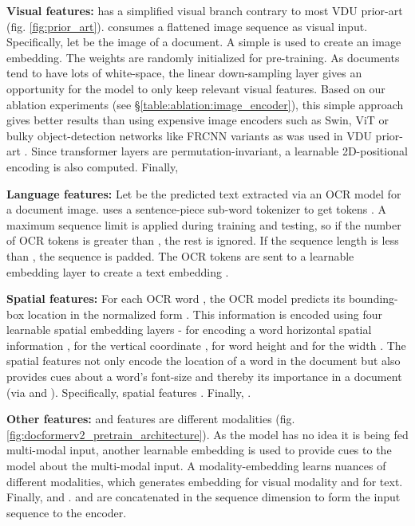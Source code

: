 \documentclass[10pt,twocolumn,letterpaper]{article}
\begin{document}
\label{sec:approach:arch:visual}
\noindent\textbf{Visual features:} \papertitleshort has a simplified visual branch contrary to most VDU prior-art (fig. \ref{fig:prior_art}). \papertitleshort consumes a flattened image sequence as visual input. Specifically, let  be the image of a document. A simple  is used to create an image embedding. The weights are randomly initialized for pre-training. As documents tend to have lots of white-space, the linear down-sampling layer gives an opportunity for the model to only keep relevant visual features. Based on our ablation experiments (see \S \ref{table:ablation:image_encoder}), this simple approach gives better results than using expensive image encoders such as Swin, ViT  \cite{Liu2021Swin, dosovitskiy2020image, Ronneberger2015UNet} or bulky object-detection networks like FRCNN variants \cite{Ren2015FasterFRCNN} as was used in VDU prior-art \cite{powalski2021going,appalaraju2021docformer,xu2021layoutlmv2}.
Since transformer layers are permutation-invariant, a learnable 2D-positional encoding  is also computed. Finally, 


\label{sec:approach:arch:language}
\noindent\textbf{Language features:} Let  be the predicted text extracted via an OCR model for a document image. \papertitleshort uses a sentence-piece sub-word tokenizer \cite{Kudo2018SentencePiece} to get tokens . A maximum sequence limit  is applied during training and testing, so if the number of OCR tokens is greater than , the rest is ignored. If the sequence length is less than , the sequence is padded. The OCR tokens  are sent to a learnable embedding layer  to create a text embedding .

\label{sec:approach:arch:spatial}
\noindent\textbf{Spatial features:} For each OCR word , the OCR model predicts its bounding-box location in the normalized form . This information is encoded using four learnable spatial embedding layers -  for encoding a word horizontal spatial information ,  for the vertical coordinate ,  for word height  and  for the width . The spatial features not only encode the location of a word in the document but also provides cues about a word's font-size and thereby its importance in a document (via  and ). Specifically, spatial features  .  Finally, .



\label{sec:approach:arch:other}
\noindent\textbf{Other features:}  and  features are different modalities (fig. \ref{fig:docformerv2_pretrain_architecture}). As the model has no idea it is being fed multi-modal input, another learnable embedding  is used to provide cues to the model about the multi-modal input. A modality-embedding  learns nuances of different modalities, which generates  embedding for visual modality and  for text. Finally,  and .  and  are concatenated in the sequence dimension to form the input sequence to the \papertitleshort encoder.
\end{document}
